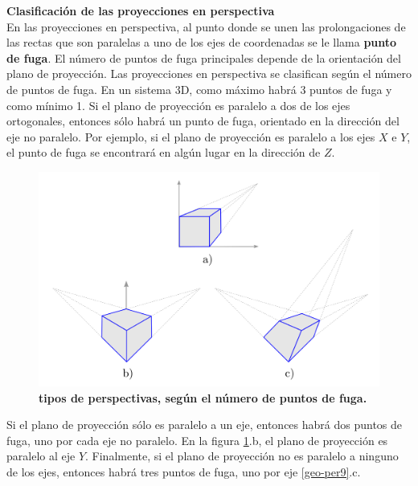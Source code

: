 \textbf{Clasificación de las proyecciones en perspectiva}\\
En las proyecciones en perspectiva, al punto donde se unen las prolongaciones de las rectas que son paralelas a uno de los ejes de coordenadas se le llama \textbf{punto de fuga}. El número de puntos de fuga principales depende de la orientación del plano de proyección. Las proyecciones en perspectiva se clasifican según el número de puntos de fuga. En un sistema 3D, como máximo habrá 3 puntos de fuga y como mínimo 1.
Si el plano de proyección es paralelo a dos de los ejes ortogonales, entonces sólo habrá un punto de fuga, orientado en la dirección del eje no paralelo. Por ejemplo, si el plano de proyección es paralelo a los ejes $X$ e $Y$, el punto de fuga se encontrará en algún lugar en la dirección de $Z$.


\begin{figure}[h]
    \includegraphics[width=12cm]{Img/GEO/geo-per-8.png}
    \centering
    \caption{\footnotesize{\textbf{tipos de perspectivas, según el número de puntos de fuga.}}}
    \label{geo-per8}
\end{figure}

Si el plano de proyección sólo es paralelo a un eje, entonces habrá dos puntos de fuga, uno por cada eje no paralelo. En la figura \ref{geo-per8}.b, el plano de proyección es paralelo al eje $Y$. Finalmente, si el plano de proyección no es paralelo a ninguno de los ejes, entonces habrá tres puntos de fuga, uno por eje \ref{geo-per9}.c.



